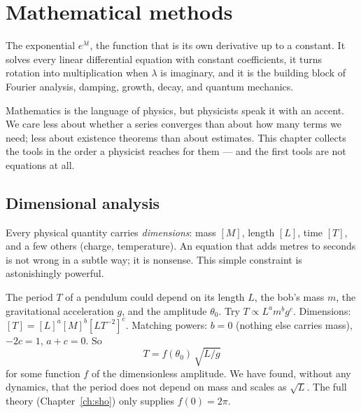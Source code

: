 \chapter{Mathematical methods}
\label{ch:math}



\begin{prototype}
The exponential $e^{\lambda t}$, the function that is its own derivative up to a constant. It solves every linear differential equation with constant coefficients, it turns rotation into multiplication when $\lambda$ is imaginary, and it is the building block of Fourier analysis, damping, growth, decay, and quantum mechanics.
\end{prototype}

Mathematics is the language of physics, but physicists speak it with an accent. We care less about whether a series converges than about how many terms we need; less about existence theorems than about estimates. This chapter collects the tools in the order a physicist reaches for them --- and the first tools are not equations at all.

\section{Dimensional analysis}

Every physical quantity carries \emph{dimensions}: mass $[M]$, length $[L]$, time $[T]$, and a few others (charge, temperature). An equation that adds metres to seconds is not wrong in a subtle way; it is nonsense. This simple constraint is astonishingly powerful.

\begin{example}
The period $T$ of a pendulum could depend on its length $L$, the bob's mass $m$, the gravitational acceleration $g$, and the amplitude $\theta_0$. Try $T \propto L^a m^b g^c$. Dimensions: $[T] = [L]^a [M]^b [L T^{-2}]^c$. Matching powers: $b=0$ (nothing else carries mass), $-2c = 1$, $a + c = 0$. So
\[
  T = f(\theta_0)\,\sqrt{L/g}
\]
for some function $f$ of the dimensionless amplitude. We have found, without any dynamics, that the period does not depend on mass and scales as $\sqrt{L}$. The full theory (Chapter~\ref{ch:sho}) only supplies $f(0)=2\pi$.
\end{example}

